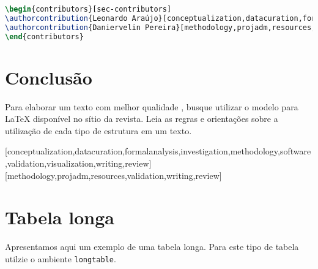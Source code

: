 \documentclass[portuguese]{textolivre}
\begin{document}
\begin{lstlisting}[language=tex, label=lst-contributions, caption={Contribuição dos autores.}]
\begin{contributors}[sec-contributors]
\authorcontribution{Leonardo Araújo}[conceptualization,datacuration,formalanalysis,investigation,methodology,software,validation,visualization,writing,review]
\authorcontribution{Daniervelin Pereira}[methodology,projadm,resources,validation,writing,review]
\end{contributors}
\end{lstlisting} %



\section{Conclusão}\label{sec-conclusao}
Para elaborar um texto com melhor qualidade \cite{donaldknuth1984,leslielamport1994,araujo2020}, busque utilizar o modelo para \LaTeX{} 
disponível no sítio da revista. Leia as regras e orientações sobre a utilização de cada tipo de estrutura em um texto.


\lipsum[17-19]


\printbibliography\label{sec-bib}


\begin{contributors}
[conceptualization,datacuration,formalanalysis,investigation,methodology,software,validation,visualization,writing,review]
[methodology,projadm,resources,validation,writing,review]
\end{contributors}


\appendix 
\section{Tabela longa}\label{apx-longtable}
Apresentamos aqui um exemplo de uma tabela longa. Para este tipo de tabela utilzie o ambiente \texttt{longtable}.
\end{document}

